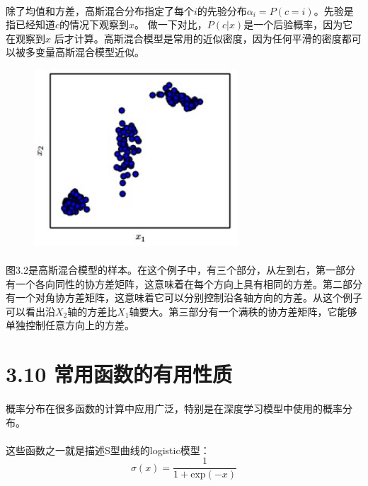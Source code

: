 \documentclass{article}
\begin{document}
    \paragraph{}
    除了均值和方差，高斯混合分布指定了每个$i$的先验分布$\alpha_{i}=P(c=i)$。先验是指已经知道$c$的情况下观察到$x$。 做一下对比，$P(c|x)$是一个后验概率，因为它在观察到$x$ 后才计算。高斯混合模型是常用的近似密度，因为任何平滑的密度都可以被多变量高斯混合模型近似。
    \begin{figure}[!htb]
    \centering
   \centerline{\includegraphics[width=3.0in]{fig/chap3/3_2.jpg}}
   \label*{图:3.2}
   \end{figure}
   \paragraph{}
   图3.2是高斯混合模型的样本。在这个例子中，有三个部分，从左到右，第一部分有一个各向同性的协方差矩阵，这意味着在每个方向上具有相同的方差。第二部分有一个对角协方差矩阵，这意味着它可以分别控制沿各轴方向的方差。从这个例子可以看出沿$X_{2}$轴的方差比$X_{1}$轴要大。第三部分有一个满秩的协方差矩阵，它能够单独控制任意方向上的方差。


    \section*{3.10 常用函数的有用性质}
    \paragraph{}
    概率分布在很多函数的计算中应用广泛，特别是在深度学习模型中使用的概率分布。
    \paragraph{}
    这些函数之一就是描述S型曲线的logistic模型：
    \begin{equation}
    \sigma(x)=\frac{1}{1+\mathrm{exp}(-x)}   \tag{3.30}
    \end{equation}
\end{document}
